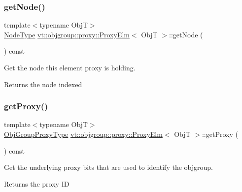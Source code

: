 \subsubsection{\texorpdfstring{get\+Node()}{getNode()}}
{\footnotesize\ttfamily template$<$typename ObjT$>$ \\
\hyperlink{namespacevt_a866da9d0efc19c0a1ce79e9e492f47e2}{Node\+Type} \hyperlink{structvt_1_1objgroup_1_1proxy_1_1_proxy_elm}{vt\+::objgroup\+::proxy\+::\+Proxy\+Elm}$<$ ObjT $>$\+::get\+Node (\begin{DoxyParamCaption}{ }\end{DoxyParamCaption}) const\hspace{0.3cm}{\ttfamily [inline]}}



Get the node this element proxy is holding. 

\begin{DoxyReturn}{Returns}
the node indexed 
\end{DoxyReturn}
\mbox{\label{structvt_1_1objgroup_1_1proxy_1_1_proxy_elm_ae7cbfe997421f265fa51cd29adc6957e}} 
\subsubsection{\texorpdfstring{get\+Proxy()}{getProxy()}}
{\footnotesize\ttfamily template$<$typename ObjT$>$ \\
\hyperlink{namespacevt_ad7cae989df485fccca57f0792a880a8e}{Obj\+Group\+Proxy\+Type} \hyperlink{structvt_1_1objgroup_1_1proxy_1_1_proxy_elm}{vt\+::objgroup\+::proxy\+::\+Proxy\+Elm}$<$ ObjT $>$\+::get\+Proxy (\begin{DoxyParamCaption}{ }\end{DoxyParamCaption}) const\hspace{0.3cm}{\ttfamily [inline]}}



Get the underlying proxy bits that are used to identify the objgroup. 

\begin{DoxyReturn}{Returns}
the proxy ID 
\end{DoxyReturn}
\mbox{\label{structvt_1_1objgroup_1_1proxy_1_1_proxy_elm_a9211613f646a4f3d215cf1d9e76219db}} 
